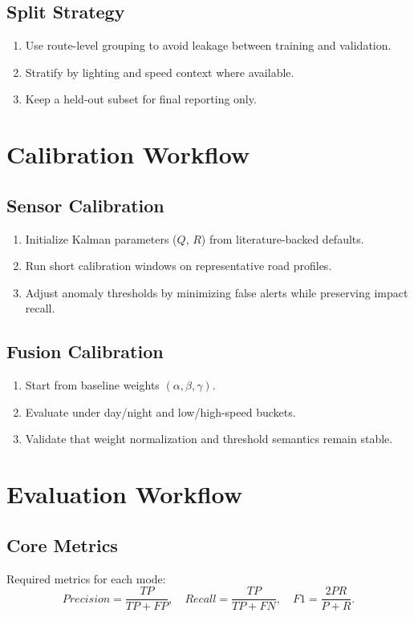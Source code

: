 \subsection{Split Strategy}
\begin{enumerate}
    \item Use route-level grouping to avoid leakage between training and validation.
    \item Stratify by lighting and speed context where available.
    \item Keep a held-out subset for final reporting only.
\end{enumerate}

\section{Calibration Workflow}
\subsection{Sensor Calibration}
\begin{enumerate}
    \item Initialize Kalman parameters ($Q$, $R$) from literature-backed defaults.
    \item Run short calibration windows on representative road profiles.
    \item Adjust anomaly thresholds by minimizing false alerts while preserving impact recall.
\end{enumerate}

\subsection{Fusion Calibration}
\begin{enumerate}
    \item Start from baseline weights $(\alpha,\beta,\gamma)$.
    \item Evaluate under day/night and low/high-speed buckets.
    \item Validate that weight normalization and threshold semantics remain stable.
\end{enumerate}

\section{Evaluation Workflow}
\subsection{Core Metrics}
Required metrics for each mode:
\begin{equation}
Precision = \frac{TP}{TP+FP}, \quad Recall = \frac{TP}{TP+FN}, \quad F1 = \frac{2PR}{P+R}.
\end{equation}

